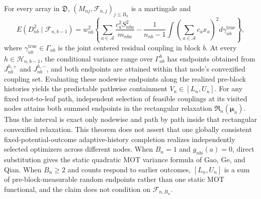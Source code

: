 For every array in \(\mathfrak D\), \((M_{nj},\mathcal F_{n,j})_{j\le B_n}\) is a martingale and \[E(D_{nb}^2\mid\mathcal F_{n,b-1})=w_{nb}^2\left\{\sum_{a\in\mathcal A}\frac{c_a^2S_{nba}^2}{m_{nba}}-\frac1{n_{nb}-1}\int\left(\sum_{a\in\mathcal A}c_ax_a\right)^2d\gamma_{nb}^{\mathrm{true}}\right\},\] where \(\gamma_{nb}^{\mathrm{true}}\in\Gamma_{nb}\) is the joint centered residual coupling in block \(b\). At every \(h\in\mathcal H_{n,b-1}\), the conditional variance range over \(\Gamma_{nb}^{h}\) has endpoints obtained from \(J_{nb}^{h,+}\) and \(J_{nb}^{h,-}\), and both endpoints are attained within that node's convexified coupling set. Evaluating these nodewise endpoints along the realized pre-block histories yields the predictable pathwise containment \(V_n\in[L_n,U_n]\). For any fixed root-to-leaf path, independent selection of feasible couplings at its visited nodes attains both summed endpoints in the rectangular relaxation \(\mathfrak R_n(\boldsymbol\mu_n)\). Thus the interval is exact only nodewise and path by path inside that rectangular convexified relaxation. This theorem does not assert that one globally consistent fixed-potential-outcome adaptive-history completion realizes independently selected optimizers across different nodes. When \(B_n=1\) and \(g_{nbi}(a)=0\), direct substitution gives the static quadratic MOT variance formula of Gao, Ge, and Qian. When \(B_n\ge2\) and counts respond to earlier outcomes, \([L_n,U_n]\) is a sum of pre-block-measurable random endpoints rather than one static MOT functional, and the claim does not condition on \(\mathcal F_{n,B_n}\).